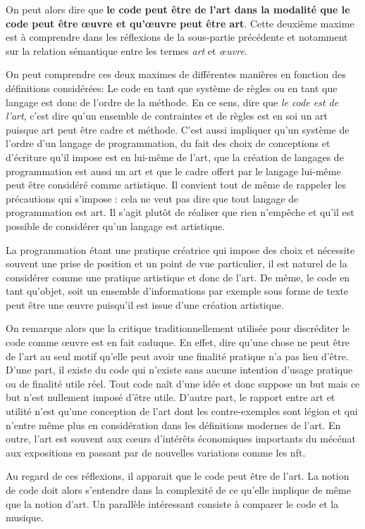 \documentclass[12pt]{article} %
\begin{document}
On peut alors dire que \textbf{le code peut être de l'art dans la modalité que le code peut être œuvre et qu'œuvre peut être art}. Cette deuxième maxime est à comprendre dans les réflexions de la sous-partie précédente et notamment sur la relation sémantique entre les termes \textit{art} et \textit{œuvre}.

On peut comprendre ces deux maximes de différentes manières en fonction des définitions considérées: Le code en tant que système de règles ou en tant que langage est donc de l'ordre de la méthode. En ce sens, dire que \textit{le code est de l'art}, c'est dire qu'un ensemble de contraintes et de règles est en soi un art puisque art peut être cadre et méthode. C'est aussi impliquer qu'un système de l'ordre d'un langage de programmation, du fait des choix de conceptions et d'écriture qu'il impose est en lui-même de l'art, que la création de langages de programmation est aussi un art et que le cadre offert par le langage lui-même peut être considéré comme artistique. Il convient tout de même de rappeler les précautions qui s'impose : cela ne veut pas dire que tout langage de programmation est art. Il s'agit plutôt de réaliser que rien n'empêche et qu'il est possible de considérer qu'un langage est artistique.

La programmation étant une pratique créatrice qui impose des choix et nécessite souvent une prise de position et un point de vue particulier, il est naturel de la considérer comme une pratique artistique et donc de l'art. De même, le code en tant qu'objet, soit un ensemble d'informations par exemple sous forme de texte peut être une œuvre puisqu'il est issue d'une création artistique.

On remarque alors que la critique traditionnellement utilisée pour discréditer le code comme œuvre est en fait caduque. En effet, dire qu'une chose ne peut être de l'art au seul motif qu'elle peut avoir une finalité pratique n'a pas lieu d'être. D'une part, il existe du code qui n'existe sans aucune intention d'usage pratique ou de finalité utile réel. Tout code naît d'une idée et donc suppose un but mais ce but n'est nullement imposé d'être utile. D'autre part, le rapport entre art et utilité n'est qu'une conception de l'art dont les contre-exemples sont légion et qui n'entre même plus en considération dans les définitions modernes de l'art. En outre, l'art est souvent aux cœurs d'intérêts économiques importants du mécénat aux expositions en passant par de nouvelles variations comme les \acrshort{nft}.

Au regard de ces réflexions, il apparait que le code peut être de l'art. La notion de code doit alors s'entendre dans la complexité de ce qu'elle implique de même que la notion d'art. Un parallèle intéressant consiste à comparer le code et la musique.
\end{document}
